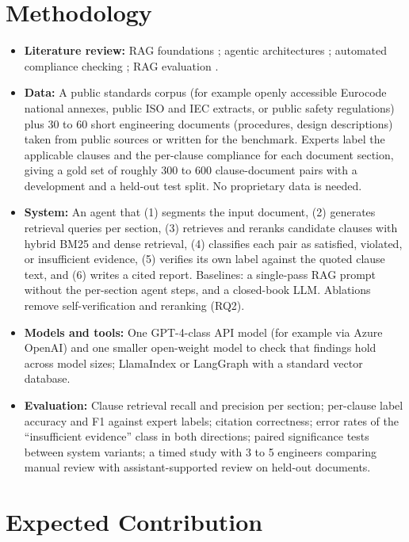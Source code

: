 \documentclass[10pt,a4paper]{article}
\begin{document}
\section{Methodology}

\begin{itemize}
    \item \textbf{Literature review:} RAG foundations \cite{lewis2020rag}; agentic architectures \cite{yao2023react, singh2025agentic}; automated compliance checking \cite{zhang2016}; RAG evaluation \cite{es2024ragas, ragindustry2025}.
    \item \textbf{Data:} A public standards corpus (for example openly accessible Eurocode national annexes, public ISO and IEC extracts, or public safety regulations) plus 30 to 60 short engineering documents (procedures, design descriptions) taken from public sources or written for the benchmark. Experts label the applicable clauses and the per-clause compliance for each document section, giving a gold set of roughly 300 to 600 clause-document pairs with a development and a held-out test split. No proprietary data is needed.
    \item \textbf{System:} An agent that (1) segments the input document, (2) generates retrieval queries per section, (3) retrieves and reranks candidate clauses with hybrid BM25 and dense retrieval, (4) classifies each pair as satisfied, violated, or insufficient evidence, (5) verifies its own label against the quoted clause text, and (6) writes a cited report. Baselines: a single-pass RAG prompt without the per-section agent steps, and a closed-book LLM. Ablations remove self-verification and reranking (RQ2).
    \item \textbf{Models and tools:} One GPT-4-class API model (for example via Azure OpenAI) and one smaller open-weight model to check that findings hold across model sizes; LlamaIndex or LangGraph with a standard vector database.
    \item \textbf{Evaluation:} Clause retrieval recall and precision per section; per-clause label accuracy and F1 against expert labels; citation correctness; error rates of the ``insufficient evidence'' class in both directions; paired significance tests between system variants; a timed study with 3 to 5 engineers comparing manual review with assistant-supported review on held-out documents.
\end{itemize}

\section{Expected Contribution}
\end{document}
